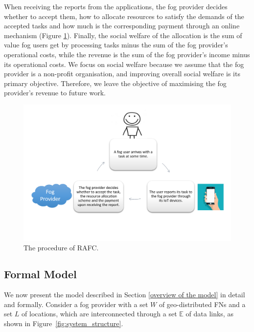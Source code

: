 \documentclass[11pt]{phdthesis}
\begin{document}
When receiving the reports from the applications, the fog provider decides whether to accept them, how to allocate resources to satisfy the demands of the accepted tasks and how much is the corresponding payment through an online mechanism (Figure \ref{fig: procedure}). Finally, the social welfare of the allocation is the sum of value fog users get by processing tasks minus the sum of the fog provider's operational costs, while the revenue is the sum of the fog provider's income minus its operational costs. We focus on social welfare because we assume that the fog provider is a non-profit organisation, and improving overall social welfare is its primary objective. Therefore, we leave the objective of maximising the fog provider’s revenue to future work.

\begin{figure}
    \centering
    \includegraphics[width=1\textwidth]{./Figures/Allocation_procedure.png}
    \caption{\label{fig: procedure} The procedure of RAFC.}
\end{figure}

\subsection{Formal Model} \label{formal model}

We now present the model described in Section \ref{overview of the model} in detail and formally. Consider a fog provider with a set $W$ of geo-distributed FNs and a set $L$ of locations, which are interconnected through a set $\mathbb{E}$ of data links, as shown in Figure~\ref{fig:system_structure}. 
\end{document}
